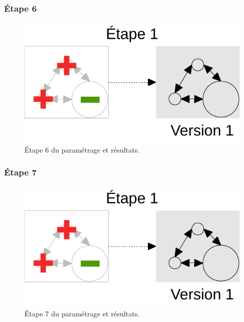 \documentclass[12pt, a4paper, oneside]{book}
\begin{document}
	\subsubsection{Étape 6}
		\begin{figure}[H]
			\centering
			\includegraphics[width = \linewidth, page = 6]{img/schemas_etapes_individuelles.pdf}
			\caption{Étape 6 du paramétrage et résultats.}
		\end{figure}

\pagebreak
	\subsubsection{Étape 7}
		\begin{figure}[H]
			\centering
			\includegraphics[width = \linewidth, page = 7]{img/schemas_etapes_individuelles.pdf}
			\caption{Étape 7 du paramétrage et résultats.}
		\end{figure}

\pagebreak
\end{document}

